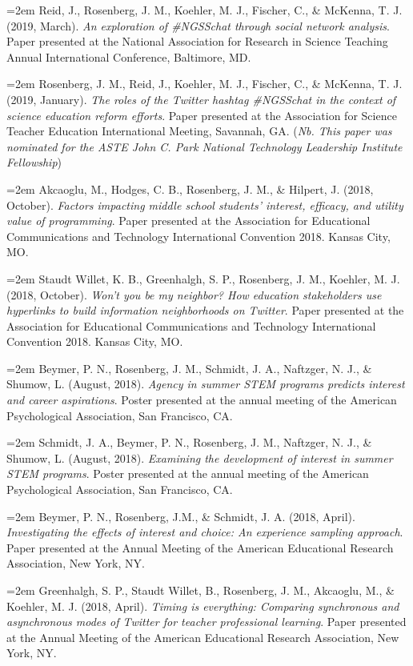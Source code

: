 \documentclass[
  14,
]{article}
\begin{document}
\hangindent=2em Reid, J., Rosenberg, J. M., Koehler, M. J., Fischer, C.,
\& McKenna, T. J. (2019, March). \emph{An exploration of \#NGSSchat
through social network analysis}. Paper presented at the National
Association for Research in Science Teaching Annual International
Conference, Baltimore, MD.

\hangindent=2em Rosenberg, J. M., Reid, J., Koehler, M. J., Fischer, C.,
\& McKenna, T. J. (2019, January). \emph{The roles of the Twitter
hashtag \#NGSSchat in the context of science education reform efforts}.
Paper presented at the Association for Science Teacher Education
International Meeting, Savannah, GA. (\emph{Nb. This paper was nominated
for the ASTE John C. Park National Technology Leadership Institute
Fellowship})

\hangindent=2em Akcaoglu, M., Hodges, C. B., Rosenberg, J. M., \&
Hilpert, J. (2018, October). \emph{Factors impacting middle school
students' interest, efficacy, and utility value of programming}. Paper
presented at the Association for Educational Communications and
Technology International Convention 2018. Kansas City, MO.

\hangindent=2em Staudt Willet, K. B., Greenhalgh, S. P., Rosenberg, J.
M., Koehler, M. J. (2018, October). \emph{Won't you be my neighbor? How
education stakeholders use hyperlinks to build information neighborhoods
on Twitter}. Paper presented at the Association for Educational
Communications and Technology International Convention 2018. Kansas
City, MO.

\hangindent=2em Beymer, P. N., Rosenberg, J. M., Schmidt, J. A.,
Naftzger, N. J., \& Shumow, L. (August, 2018). \emph{Agency in summer
STEM programs predicts interest and career aspirations}. Poster
presented at the annual meeting of the American Psychological
Association, San Francisco, CA.

\hangindent=2em Schmidt, J. A., Beymer, P. N., Rosenberg, J. M.,
Naftzger, N. J., \& Shumow, L. (August, 2018). \emph{Examining the
development of interest in summer STEM programs}. Poster presented at
the annual meeting of the American Psychological Association, San
Francisco, CA.

\hangindent=2em Beymer, P. N., Rosenberg, J.M., \& Schmidt, J. A. (2018,
April). \emph{Investigating the effects of interest and choice: An
experience sampling approach}. Paper presented at the Annual Meeting of
the American Educational Research Association, New York, NY.

\hangindent=2em Greenhalgh, S. P., Staudt Willet, B., Rosenberg, J. M.,
Akcaoglu, M., \& Koehler, M. J. (2018, April). \emph{Timing is
everything: Comparing synchronous and asynchronous modes of Twitter for
teacher professional learning}. Paper presented at the Annual Meeting of
the American Educational Research Association, New York, NY.
\end{document}
